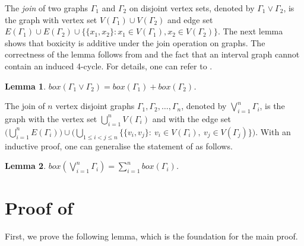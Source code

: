 \documentclass[twoside, 11pt]{article}
\newtheorem{lemma}{Lemma}
\newcommand{\G}{\Gamma}
\begin{document}
The \textit{join} of two graphs $\G_1$ and $\G_2$ on disjoint vertex sets, denoted by $\G_1 \vee \G_2$, is the graph
with vertex set $V(\G_1) \cup V(\G_2)$ and edge set $E(\G_1) \cup E(\G_2) \cup \{\{x_1, x_2\} : x_1 \in V(\G_1), x_2 \in V(\G_2)\}$. The next lemma shows that boxicity is additive under the join operation on graphs. The correctness of the lemma follows from  and the fact that an interval graph cannot contain an induced 4-cycle. For details, one can refer to \cite[Lemma 3]{trotter1979characterization}.  %

 \begin{lemma}\label{join}
 $box(\G_1 \vee \G_2) = box(\G_1) + box(\G_2)$.
\end{lemma}

The join of $n$ vertex disjoint graphs $\G_1,\G_2,\dots, \G_n$, denoted by $\bigvee_{i=1}^n \G_i$, is the graph with the vertex set $\bigcup_{i=1}^n V(\G_i)$ and with the edge set $\big(\bigcup_{i=1}^n E(\G_i)\big) \cup \big(\bigcup_{1\leq i < j \leq n} \{ \{v_i,v_j\} : \ v_i \in V(\G_i), \  v_j \in V(\G_j)\}\big)$. With an inductive proof, one can generalise the statement of  as follows.

\begin{lemma}\label{general join}
    $box(\bigvee_{i=1}^n \G_i)=\sum_{i=1}^n box(\G_i)$.
\end{lemma}

\section{Proof of }

First, we prove the following lemma, which is the foundation for the main proof.
\end{document}
